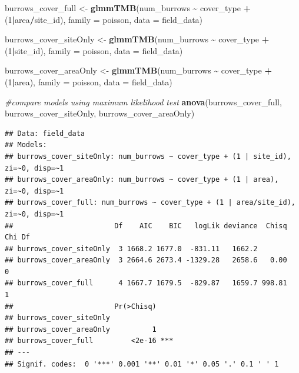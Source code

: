 \documentclass[
]{article}
\newenvironment{Shaded}{\begin{snugshade}}{\end{snugshade}}
\newcommand{\AttributeTok}[1]{\textcolor[rgb]{0.13,0.29,0.53}{#1}}
\newcommand{\CommentTok}[1]{\textcolor[rgb]{0.56,0.35,0.01}{\textit{#1}}}
\newcommand{\DecValTok}[1]{\textcolor[rgb]{0.00,0.00,0.81}{#1}}
\newcommand{\FunctionTok}[1]{\textcolor[rgb]{0.13,0.29,0.53}{\textbf{#1}}}
\newcommand{\NormalTok}[1]{#1}
\newcommand{\OtherTok}[1]{\textcolor[rgb]{0.56,0.35,0.01}{#1}}
\newcommand{\SpecialCharTok}[1]{\textcolor[rgb]{0.81,0.36,0.00}{\textbf{#1}}}
\begin{document}
\begin{Shaded}
\begin{Highlighting}[]
\NormalTok{burrows\_cover\_full }\OtherTok{\textless{}{-}} \FunctionTok{glmmTMB}\NormalTok{(num\_burrows }\SpecialCharTok{\textasciitilde{}}\NormalTok{ cover\_type }\SpecialCharTok{+} 
\NormalTok{                             (}\DecValTok{1}\SpecialCharTok{|}\NormalTok{area}\SpecialCharTok{/}\NormalTok{site\_id),}
                           \AttributeTok{family =}\NormalTok{ poisson, }
                           \AttributeTok{data =}\NormalTok{ field\_data)}

\NormalTok{burrows\_cover\_siteOnly }\OtherTok{\textless{}{-}} \FunctionTok{glmmTMB}\NormalTok{(num\_burrows }\SpecialCharTok{\textasciitilde{}}\NormalTok{ cover\_type }\SpecialCharTok{+} 
\NormalTok{                             (}\DecValTok{1}\SpecialCharTok{|}\NormalTok{site\_id),}
                           \AttributeTok{family =}\NormalTok{ poisson, }
                           \AttributeTok{data =}\NormalTok{ field\_data)}

\NormalTok{burrows\_cover\_areaOnly }\OtherTok{\textless{}{-}} \FunctionTok{glmmTMB}\NormalTok{(num\_burrows }\SpecialCharTok{\textasciitilde{}}\NormalTok{ cover\_type }\SpecialCharTok{+} 
\NormalTok{                             (}\DecValTok{1}\SpecialCharTok{|}\NormalTok{area),}
                           \AttributeTok{family =}\NormalTok{ poisson, }
                           \AttributeTok{data =}\NormalTok{ field\_data)}


\CommentTok{\#compare models using maximum likelihood test}
\FunctionTok{anova}\NormalTok{(burrows\_cover\_full, burrows\_cover\_siteOnly, burrows\_cover\_areaOnly)}
\end{Highlighting}
\end{Shaded}

\begin{verbatim}
## Data: field_data
## Models:
## burrows_cover_siteOnly: num_burrows ~ cover_type + (1 | site_id), zi=~0, disp=~1
## burrows_cover_areaOnly: num_burrows ~ cover_type + (1 | area), zi=~0, disp=~1
## burrows_cover_full: num_burrows ~ cover_type + (1 | area/site_id), zi=~0, disp=~1
##                        Df    AIC    BIC   logLik deviance  Chisq Chi Df
## burrows_cover_siteOnly  3 1668.2 1677.0  -831.11   1662.2              
## burrows_cover_areaOnly  3 2664.6 2673.4 -1329.28   2658.6   0.00      0
## burrows_cover_full      4 1667.7 1679.5  -829.87   1659.7 998.81      1
##                        Pr(>Chisq)    
## burrows_cover_siteOnly               
## burrows_cover_areaOnly          1    
## burrows_cover_full         <2e-16 ***
## ---
## Signif. codes:  0 '***' 0.001 '**' 0.01 '*' 0.05 '.' 0.1 ' ' 1
\end{verbatim}
\end{document}

